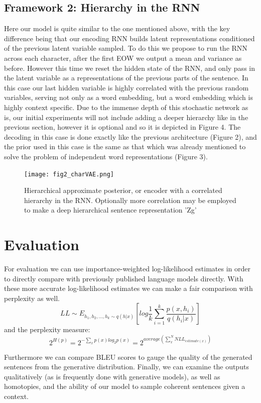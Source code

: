 \documentclass[journal, 12pt, draftcls, onecolumn]{IEEEtran}
\begin{document}
\subsection{Framework 2: Hierarchy in the RNN}
Here our model is quite similar to the one mentioned above, with the key difference being that our encoding RNN builds latent representations conditioned of the previous latent variable sampled. To do this we propose to run the RNN across each character, after the first EOW we output a mean and variance as before. However this time we reset the hidden state of the RNN, and only pass in the latent variable as a representations of the previous parts of the sentence. In this case our last hidden variable is highly correlated with the previous random variables, serving not only as a word embedding, but a word embedding which is highly context specific. Due to the immense depth of this stochastic network as is, our initial experiments will not include adding a deeper hierarchy like in the previous section, however it is optional and so it is depicted in Figure 4. The decoding in this case is done exactly like the previous architecture (Figure 2), and the prior used in this case is the same as that which was already mentioned to solve the problem of independent word representations (Figure 3).

\begin{figure}
\centering
\texttt{[image: fig2\_charVAE.png]}
\caption{Hierarchical approximate posterior, or encoder with a correlated hierarchy in the RNN. Optionally more correlation may be employed to make a deep hierarchical sentence representation 'Zg'}
\end{figure}


\section {Evaluation} \label{eval}
For evaluation we can use importance-weighted log-likelihood \cite{C17} estimates in order to directly compare with previously published language models directly. With these more accurate log-likelihood estimates we can make a fair comparison with perplexity as well.
\[LL \sim E_{h_1,h_2,...,h_k \sim q(h|x)}[log \dfrac{1}{k} \sum_{i=1}^k \dfrac{p(x,h_i)}{q(h_i|x)}]\]
and the perplexity measure:
\[2^{H(p)}= 2^{-\sum_x p(x) log_2 p(x)}=2^{average(\sum_x^N NLL_{estimate(x)})}\]

Furthermore we can compare BLEU scores to gauge the quality of the generated sentences from the generative distribution. Finally, we can examine the outputs qualitatively (as is frequently done with generative models), as well as homotopies, and the ability of our model to sample coherent sentences given a context.
\end{document}
